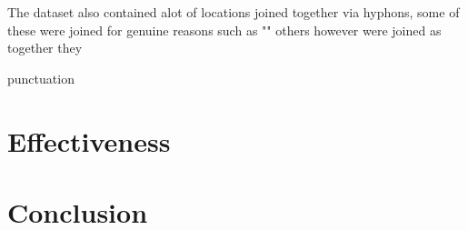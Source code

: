 \documentclass[a4paper]{article}
\begin{document}
The dataset also contained alot of locations joined together via hyphons, some of these were joined for genuine reasons such as ""
others however were joined as together they 


punctuation 

\section{Effectiveness}
\section{Conclusion}
\end{document}
